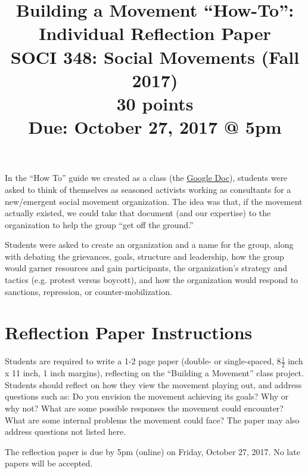 \documentclass{article}
\begin{document}
\title{Building a Movement ``How-To'': Individual Reflection Paper\\ SOCI 348: Social Movements (Fall 2017) \\ {\Large{30 points}} \\ {\Large{Due: October 27, 2017 @ 5pm}}}
\author[*]{}
\date{}
\maketitle

In the ``How To'' guide we created as a class (the {\color{blue}\href{https://docs.google.com/a/uci.edu/document/d/1H5a3ikUP_A4Dbw0-Ge_srnCb-MGhcEnaY_yIQENpq6A/edit?usp=sharing}{Google Doc}}), students were asked to think of themselves as seasoned activists working as consultants for a new/emergent social movement organization. The idea was that, if the movement actually existed, we could take that document (and our expertise) to the organization to help the group ``get off the ground.''\newline

Students were asked to create an organization and a name for the group, along with debating the grievances, goals, structure and leadership, how the group would garner resources and gain participants, the organization's strategy and tactics (e.g. protest versus boycott), and how the organization would respond to sanctions, repression, or counter-mobilization. \newline


\section*{Reflection Paper Instructions}

Students are required to write a 1-2 page paper (double- or single-spaced, 8$\frac{1}{2}$ inch x 11 inch, 1 inch margins), reflecting on the ``Building a Movement'' class project. Students should reflect on how they view the movement playing out, and address questions such as: Do you envision the movement achieving its goals? Why or why not? What are some possible responses the movement could encounter? What are some internal problems the movement could face? The paper may also address questions not listed here.\newline

The reflection paper is due by 5pm (online) on Friday, October 27, 2017. No late papers will be accepted.
\end{document}
